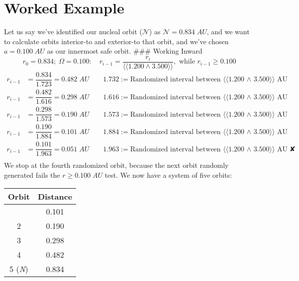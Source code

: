 \documentclass[
  letterpaper,
]{book}
\begin{document}
\section{Worked Example}\label{worked-example}

Let us say we've identified our nucleal orbit (\(\mathcal{N}\)) as
\(\mathcal{N} = 0.834\;AU\), and we want to calculate orbits interior-to
and exterior-to that orbit, and we've chosen \(a = 0.100\;AU\) as our
innermost safe orbit. \#\#\# Working Inward \[
  r_0 = 0.834;\; \Omega = 0.100:
  \quad r_{i-1} = \dfrac{r_i} {⟨⟨1.200 ∧ 3.500⟩⟩}, \text{ while } r_{i-1} \geq 0.100
\] \[
\begin{align}
r_{i-1} &= \dfrac{0.834} {1.723} = 0.482\;AU \qquad 1.732 := \text{Randomized interval between ⟨⟨1.200 ∧ 3.500⟩⟩ AU} \\[1em]
r_{i-1} &= \dfrac{0.482} {1.616} = 0.298\;AU \qquad 1.616 := \text{Randomized interval between ⟨⟨1.200 ∧ 3.500⟩⟩ AU} \\[1em]
r_{i-1} &= \dfrac{0.298} {1.573} = 0.190\;AU \qquad 1.573 := \text{Randomized interval between ⟨⟨1.200 ∧ 3.500⟩⟩ AU} \\[1em]
r_{i-1} &= \dfrac{0.190} {1.884} = 0.101\;AU \qquad 1.884 := \text{Randomized interval between ⟨⟨1.200 ∧ 3.500⟩⟩ AU} \\[1em]
r_{i-1} &= \dfrac{0.101} {1.963} = 0.051\;AU \qquad 1.963 := \text{Randomized interval between ⟨⟨1.200 ∧ 3.500⟩⟩ AU}\;✘ \\[1em]
\end{align}
\] We stop at the fourth randomized orbit, because the next orbit
randomly generated fails the \(r ≥ 0.100\;AU\) test. We now have a
system of five orbits:

\begin{longtable}[]{@{}cc@{}}
\toprule\noalign{}
Orbit & Distance \\
\midrule\noalign{}
\endhead
\bottomrule\noalign{}
\endlastfoot
1 & 0.101 \\
2 & 0.190 \\
3 & 0.298 \\
4 & 0.482 \\
5 (\emph{N}) & 0.834 \\
\end{longtable}
\end{document}
